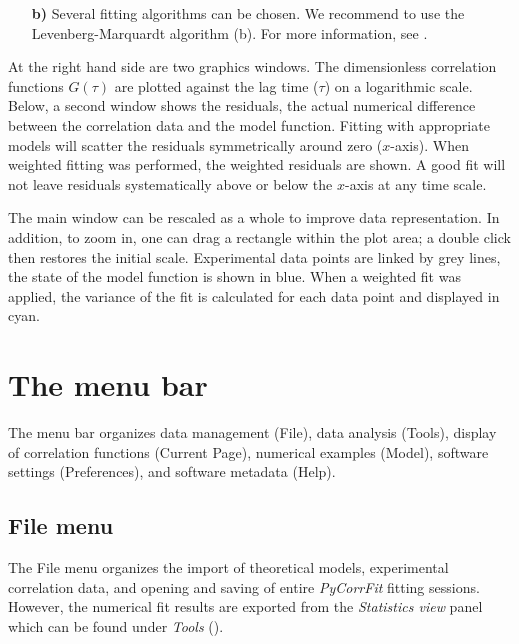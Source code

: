 \begin{itemize}
\begin{itemize}
\item[\textbf{b)}] Several fitting algorithms can be chosen. We recommend to use the Levenberg-Marquardt algorithm (b). For more information, see .
\end{itemize}
\end{itemize}
At the right hand side are two graphics windows. The dimensionless correlation functions $G(\tau)$ are plotted against the lag time ($\tau$) on a logarithmic scale. Below, a second window shows the residuals, the actual numerical difference between the correlation data and the model function. Fitting with appropriate models will scatter the residuals symmetrically around zero ($x$-axis). When weighted fitting was performed, the weighted residuals are shown. A good fit will not leave residuals systematically above or below the $x$-axis at any time scale.

The main window can be rescaled as a whole to improve data representation. In addition, to zoom in, one can drag a rectangle within the plot area; a double click then restores the initial scale. Experimental data points are linked by grey lines, the state of the model function is shown in blue. When a weighted fit was applied, the variance of the fit is calculated for each data point and displayed in cyan.

\section{The menu bar}
\label{sec:menub}
The menu bar organizes data management (File), data analysis (Tools), display of correlation functions (Current Page), numerical examples (Model), software settings (Preferences), and software metadata (Help).

\subsection{File menu}
\label{sec:menub.filem}
The File menu organizes the import of theoretical models, experimental correlation data, and opening and saving of entire \textit{PyCorrFit} fitting sessions. However, the numerical fit results are exported from the \textit{Statistics view} panel which can be found under \textit{Tools} ().

